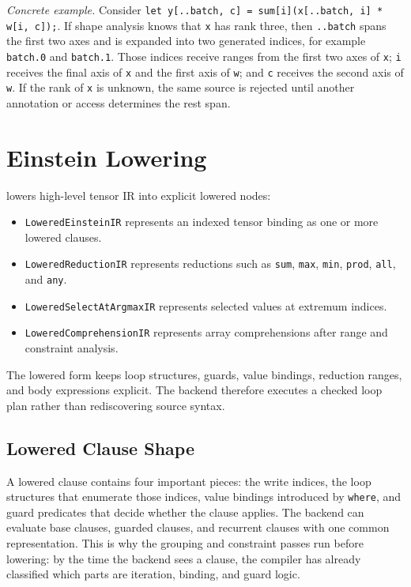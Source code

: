 \textit{Concrete example.} Consider \texttt{let y[..batch, c] =
sum[i](x[..batch, i] * w[i, c]);}. If shape analysis knows that \texttt{x} has
rank three, then \texttt{..batch} spans the first two axes and is expanded into
two generated indices, for example \texttt{batch.0} and \texttt{batch.1}. Those
indices receive ranges from the first two axes of \texttt{x}; \texttt{i}
receives the final axis of \texttt{x} and the first axis of \texttt{w}; and
\texttt{c} receives the second axis of \texttt{w}. If the rank of \texttt{x}
is unknown, the same source is rejected until another annotation or access
determines the rest span.

\section{Einstein Lowering}

 lowers high-level tensor IR
into explicit lowered nodes:

\begin{itemize}
\item \texttt{LoweredEinsteinIR} represents an indexed tensor binding as one or
more lowered clauses.
\item \texttt{LoweredReductionIR} represents reductions such as \texttt{sum},
\texttt{max}, \texttt{min}, \texttt{prod}, \texttt{all}, and \texttt{any}.
\item \texttt{LoweredSelectAtArgmaxIR} represents selected values at extremum
indices.
\item \texttt{LoweredComprehensionIR} represents array comprehensions after
range and constraint analysis.
\end{itemize}

The lowered form keeps loop structures, guards, value bindings, reduction
ranges, and body expressions explicit. The backend therefore executes a checked
loop plan rather than rediscovering source syntax.

\subsection{Lowered Clause Shape}

A lowered clause contains four important pieces: the write indices, the loop
structures that enumerate those indices, value bindings introduced by
\texttt{where}, and guard predicates that decide whether the clause applies.
The backend can evaluate base clauses, guarded clauses, and recurrent clauses
with one common representation. This is why the grouping and constraint passes
run before lowering: by the time the backend sees a clause, the compiler has
already classified which parts are iteration, binding, and guard logic.

